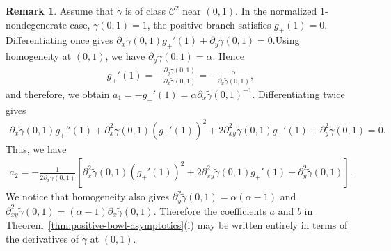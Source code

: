 \documentclass{amsart}
\theoremstyle{plain}
\theoremstyle{mainintrothm}
\theoremstyle{definition}
\newtheorem{remark}[theorem]{Remark}
\begin{document}
	
	
	\begin{remark}
		\label{rem:nondegenerate-coefficients-gamma-derivatives}
		Assume that $\widetilde\gamma$ is of class $\mathcal C^2$ near $(0,1)$.
		In the normalized $1$-nondegenerate case, $\widetilde\gamma(0,1)=1$,
		the positive branch satisfies $g_+(1)=0$. Differentiating once gives
		$\partial_x\widetilde\gamma(0,1)g_+'(1)+\partial_y\widetilde\gamma(0,1)=0$.Using homogeneity at $(0,1)$, we have
		$\partial_y\widetilde\gamma(0,1)=\alpha$.  Hence
		\begin{align*}
			g_+'(1)
			=
			-\frac{\partial_y\widetilde\gamma(0,1)}
			{\partial_x\widetilde\gamma(0,1)}
			=
			-\frac{\alpha}{\partial_x\widetilde\gamma(0,1)},
		\end{align*}
		and therefore, we obtain  $a_1=-g_+'(1)=\alpha\partial_x\widetilde\gamma(0,1)^{-1}$. Differentiating twice gives
		\begin{align*}
			\partial_x\widetilde\gamma(0,1)g_+''(1)
			+
			\partial_x^2\widetilde\gamma(0,1)(g_+'(1))^2
			+
			2\partial_{xy}^2\widetilde\gamma(0,1)g_+'(1)
			+
			\partial_y^2\widetilde\gamma(0,1)
			=
			0.
		\end{align*}
		Thus, we have 
		\begin{align*}
			a_2
			=
			-\frac{1}{2\partial_x\widetilde\gamma(0,1)}
			\left[
			\partial_x^2\widetilde\gamma(0,1)(g_+'(1))^2
			+
			2\partial_{xy}^2\widetilde\gamma(0,1)g_+'(1)
			+
			\partial_y^2\widetilde\gamma(0,1)
			\right].
		\end{align*}
		We notice that homogeneity also gives $\partial_y^2\widetilde\gamma(0,1)=\alpha(\alpha-1)$ and  $\partial_{xy}^2\widetilde\gamma(0,1)=(\alpha-1)\partial_x\widetilde\gamma(0,1)$. Therefore the coefficients $a$ and $b$ in
		Theorem~\ref{thm:positive-bowl-asymptotics}\textup{(i)} may be written
		entirely in terms of the derivatives of $\widetilde\gamma$ at $(0,1)$.
	\end{remark}
	
\end{document}
